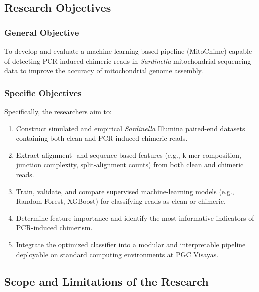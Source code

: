 \subsection{Research Objectives}\label{subsecsec:researchobjectives}

\subsubsection{General Objective}\label{subsec:generalobjective}

To develop and evaluate a machine-learning-based pipeline (MitoChime) capable of detecting PCR-induced chimeric reads in \textit{Sardinella} mitochondrial sequencing data to improve the accuracy of mitochondrial genome assembly.

\subsubsection{Specific Objectives}\label{subsec:specificobjectives}

Specifically, the researchers aim to:
\begin{enumerate}
  \item Construct simulated and empirical \textit{Sardinella} Illumina paired-end datasets containing both clean and PCR-induced chimeric reads.
  \item Extract alignment- and sequence-based features (e.g., k-mer composition, junction complexity, split-alignment counts) from both clean and chimeric reads.
  \item Train, validate, and compare supervised machine-learning models (e.g., Random Forest, XGBoost) for classifying reads as clean or chimeric.
  \item Determine feature importance and identify the most informative indicators of PCR-induced chimerism.
  \item Integrate the optimized classifier into a modular and interpretable pipeline deployable on standard computing environments at PGC Visayas.
\end{enumerate}

\subsection{Scope and Limitations of the Research}\label{sec:scopelimitations}

